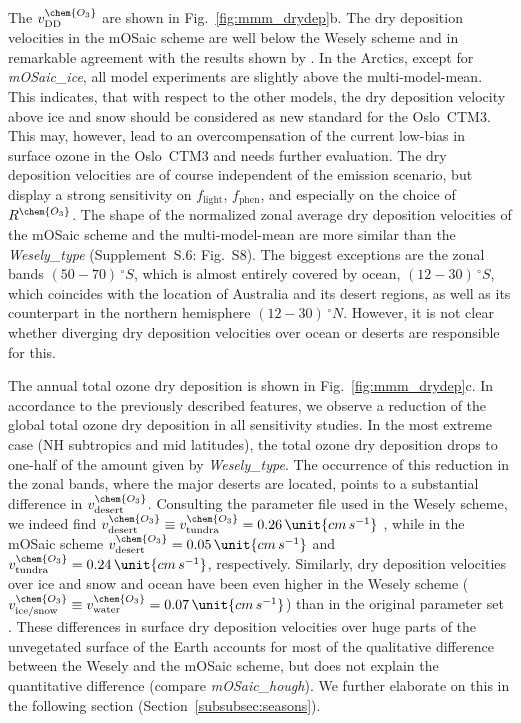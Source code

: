\documentclass[gmd, manuscript]{copernicus}
\begin{document}
The $v^\chem{O_3}_\text{DD}$ are shown in Fig.~\ref{fig:mmm_drydep}b. The dry deposition velocities in the mOSaic scheme are well below the Wesely scheme and in remarkable agreement with the results shown by \citet{ACP:Hardacre2015}. In the Arctics, except for \emph{mOSaic\_ice}, all model experiments are slightly above the multi-model-mean. This indicates, that with respect to the other models, the \citet{ACP:Helmig2007} dry deposition velocity above ice and snow should be considered as new standard for the Oslo~CTM3. This may, however, lead to an overcompensation of the current low-bias in surface ozone in the Oslo~CTM3 and needs further evaluation. The dry deposition velocities are of course independent of the emission scenario, but display a strong sensitivity on $f_\text{light}$, $f_\text{phen}$, and especially on the choice of $R^\chem{O_3}$. The shape of the normalized zonal average dry deposition velocities of the mOSaic scheme and the multi-model-mean are more similar than the \emph{Wesely\_type} (Supplement~S.6: Fig.~S8). The biggest exceptions are the zonal bands $(50-70)\,\unit{^\circ S}$, which is almost entirely covered by ocean, $(12-30)\,\unit{^\circ S}$, which coincides with the location of Australia and its desert regions, as well as its counterpart in the northern hemisphere $(12-30)\,\unit{^\circ N}$. However, it is not clear whether diverging dry deposition velocities over ocean or deserts are responsible for this.

The annual total ozone dry deposition is shown in Fig.~\ref{fig:mmm_drydep}c. In accordance to the previously described features, we observe a reduction of the global total ozone dry deposition in all sensitivity studies. In the most extreme case (NH subtropics and mid latitudes), the total ozone dry deposition drops to one-half of the amount given by \emph{Wesely\_type}. The occurrence of this reduction in the zonal bands, where the major deserts are located, points to a substantial difference in $v_\text{desert}^\chem{O_3}$. Consulting the parameter file used in the Wesely scheme, we indeed find $v_\text{desert}^\chem{O_3} \equiv v_\text{tundra}^\chem{O_3} = 0.26\,\unit{cm\,s^{-1}}$ \citep{JGR:Hough1991}, while in the mOSaic scheme $v_\text{desert}^\chem{O_3}=0.05\,\unit{cm\,s^{-1}}$ and $v^\chem{O_3}_\text{tundra} = 0.24\,\unit{cm\,s^{-1}}$, respectively. Similarly, dry deposition velocities over ice and snow and ocean have been even higher in the Wesely scheme ($v_\text{ice/snow}^\chem{O_3}\equiv v_\text{water}^\chem{O_3}=0.07\,\unit{cm\,s^{-1}}$) than in the original parameter set \citep[$v_\text{ice/snow}^\chem{O_3}\equiv v_\text{water}^\chem{O_3}=0.05\,\unit{cm\,s^{-1}}$,][]{ACP:Simpson2012}. These differences in surface dry deposition velocities over huge parts of the unvegetated surface of the Earth accounts for most of the qualitative difference between the Wesely and the mOSaic scheme, but does not explain the quantitative difference (compare \emph{mOSaic\_hough}). We further elaborate on this in the following section (Section~\ref{subsubsec:seasons}).
\end{document}
